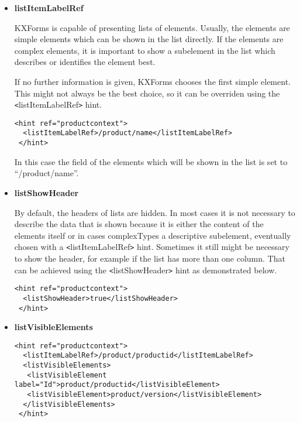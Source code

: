\begin{itemize}
 \item \textbf{listItemLabelRef}

KXForms is capable of presenting lists of elements. Usually, the elements are simple elements which can be shown in the list directly. If the elements are complex elements, it is important to show a subelement in the list which describes or identifies the element best.

If no further information is given, KXForms chooses the first simple element. This might not always be the best choice, so it can be overriden using the {\tt<}listItemLabelRef{\tt>} hint.

\begin{lstlisting}[caption=listItemLabelRef hint]
 <hint ref="productcontext">
  <listItemLabelRef>/product/name</listItemLabelRef>
 </hint>
 \end{lstlisting}

In this case the field of the elements which will be shown in the list is set to ``/product/name''.




 \item \textbf{listShowHeader}

By default, the headers of lists are hidden. In most cases it is not necessary to describe the data that is shown because it is either the content of the elements itself or in cases complexTypes a descriptive subelement, eventually chosen with a {\tt<}listItemLabelRef{\tt>} hint. Sometimes it still might be necessary to show the header, for example if the list has more than one column. That can be achieved using the {\tt<}listShowHeader{\tt>} hint as demonstrated below.

\begin{lstlisting}[caption=listShowHeader hint]
 <hint ref="productcontext">
  <listShowHeader>true</listShowHeader>
 </hint>
 \end{lstlisting}


 \item \textbf{listVisibleElements}
\label{listVisibleElements}


\begin{lstlisting}[caption=listVisibleElements hint]
 <hint ref="productcontext">
  <listItemLabelRef>/product/productid</listItemLabelRef>
  <listVisibleElements>
   <listVisibleElement label="Id">product/productid</listVisibleElement>
   <listVisibleElement>product/version</listVisibleElement>
  </listVisibleElements>
 </hint>
 \end{lstlisting}


\end{itemize}


